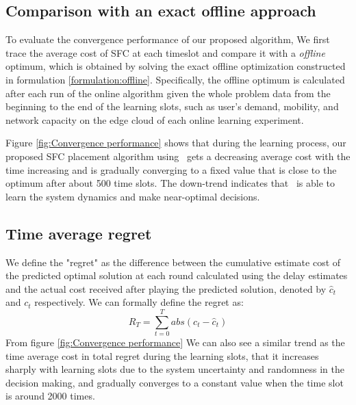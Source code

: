 \subsection{Comparison with an exact offline approach}
To evaluate the convergence performance of our proposed algorithm, We first trace the average cost of SFC at each timeslot and compare it with a \textit{offline} optimum, which is obtained by solving the exact offline optimization constructed in formulation \ref{formulation:offline}.  Specifically, the offline optimum is calculated after each run of the online algorithm given the whole problem data from the beginning to the end of the learning slots, such as user's demand, mobility, and network capacity on the edge cloud of each online learning experiment.

Figure \ref{fig:Convergence performance} shows that during the learning process, our proposed SFC placement algorithm using \myalgorithm\ gets a decreasing average cost with the time increasing and is gradually converging to a fixed value that is close to the optimum after about 500 time slots. The down-trend indicates that \myalgorithm\ is able to learn the system dynamics and make near-optimal decisions.

\subsection{Time average regret}
We define the "regret" as the difference between the cumulative estimate cost of the predicted optimal solution at each round calculated using the delay estimates and the actual cost received after playing the predicted solution, denoted by $\hat{c}_t$ and $c_t$ respectively. We can formally define the regret as:
\begin{equation}
	R_T = \sum\limits^T_{t=0} abs(c_t-\hat{c}_t)
\end{equation}
From figure \ref{fig:Convergence performance} We can also see a similar trend as the time average cost in total regret during the learning slots, that it increases sharply with learning slots due to the system uncertainty and randomness in the decision making, and gradually converges to a constant value when the time slot is around 2000 times.

